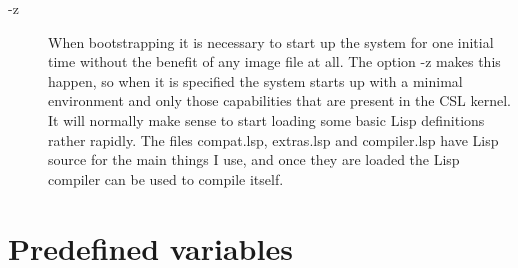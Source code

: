 \documentclass[a4paper,11pt]{article}
\begin{document}
\begin{description}
\item [{\ttfamily -z}]
When bootstrapping it is necessary to start up the system for one initial time
without the benefit of any image file at all. The option {\ttfamily -z} makes
this happen, so when it is specified the system starts up with a minimal
environment and only those capabilities that are present in the CSL
kernel. It will normally make sense to start loading some basic Lisp
definitions rather rapidly. The files {\ttfamily compat.lsp},
{\ttfamily extras.lsp} and {\ttfamily compiler.lsp} have Lisp source for the
main things I use, and once they are loaded the Lisp compiler can be used
to compile itself.

\end{description}

\section{Predefined variables}
\end{document}
